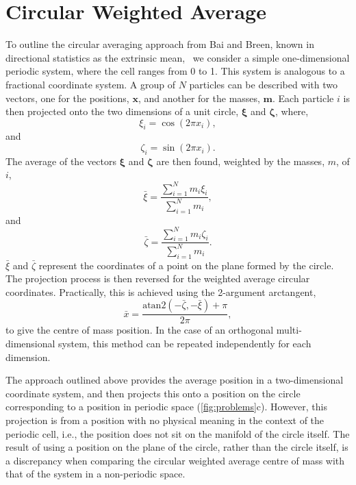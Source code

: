 \documentclass[reprint,superscriptaddress,nobibnotes,amsmath,amssymb,aip]{revtex4-2}
\begin{document}
\section{Circular Weighted Average}

To outline the circular averaging approach from Bai and Breen, known in directional statistics as the extrinsic mean,~\cite{hotz_intrinsic_2014} we consider a simple one-dimensional periodic system, where the cell ranges from \num{0} to \num{1}. 
This system is analogous to a fractional coordinate system. 
A group of $N$ particles can be described with two vectors, one for the positions, $\bm{x}$, and another for the masses, $\bm{m}$. 
Each particle $i$ is then projected onto the two dimensions of a unit circle, $\bm{\xi}$ and $\bm{\zeta}$, where, 
%
\begin{equation}
    \xi_i = \cos(2\pi x_i),
\end{equation}
%
and 
%
\begin{equation}
    \zeta_i = \sin(2\pi x_i).
\end{equation}
The average of the vectors $\bm{\xi}$ and $\bm{\zeta}$ are then found, weighted by the masses, $m$, of $i$,
%
\begin{equation}
    \bar{\xi} = \frac{\sum_{i=1}^{N}m_i\xi_i}{\sum_{i=1}^{N}m_i},
\end{equation}
% 
and
%
\begin{equation}
    \bar{\zeta} = \frac{\sum_{i=1}^{N}m_i\zeta_i}{\sum_{i=1}^{N}m_i}.
\end{equation}
% 
$\bar{\xi}$ and $\bar{\zeta}$ represent the coordinates of a point on the plane formed by the circle. 
The projection process is then reversed for the weighted average circular coordinates.
Practically, this is achieved using the 2-argument arctangent, 
%
\begin{equation}
    \bar{x} = \frac{\text{atan}2(-\bar{\zeta}, -\bar{\xi}) + \pi}{2\pi},
\end{equation}
%
to give the centre of mass position.
In the case of an orthogonal multi-dimensional system, this method can be repeated independently for each dimension. 

The approach outlined above provides the average position in a two-dimensional coordinate system, and then projects this onto a position on the circle corresponding to a position in periodic space (\cref{fig:problems}c). 
However, this projection is from a position with no physical meaning in the context of the periodic cell, i.e., the position does not sit on the manifold of the circle itself.
The result of using a position on the plane of the circle, rather than the circle itself, is a discrepancy when comparing the circular weighted average centre of mass with that of the system in a non-periodic space. 
\end{document}
